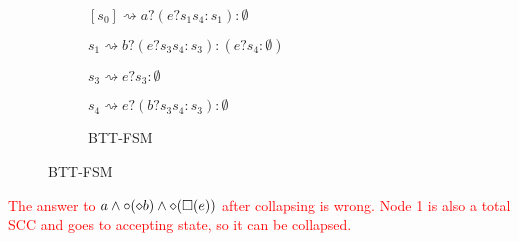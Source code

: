 \begin{enumerate}
\begin{figure}[H]
\begin{subfigure}[t]{0.45\textwidth}
	\end{subfigure}
	\begin{subfigure}[t]{.35\textwidth}
		\caption{BTT-FSM}
		$[s_0] \rightsquigarrow a ? (e ? s_1 s_4 : s_1) : \emptyset$

		$s_1 \rightsquigarrow b ? (e?s_3 s_4 : s_3) : (e ? s_4 : \emptyset)$

		$s_3 \rightsquigarrow e ? s_3 : \emptyset$

		$s_4 \rightsquigarrow e ? (b?s_3 s_4 : s_3) : \emptyset$
	\end{subfigure}
\end{figure}

\textcolor{red}{
	The answer to $a\land\circ(\diamond b)\land \diamond(\square(e))$ after collapsing is wrong.
	Node 1 is also a total SCC and goes to accepting state, so it can be collapsed.
}

\end{enumerate}




